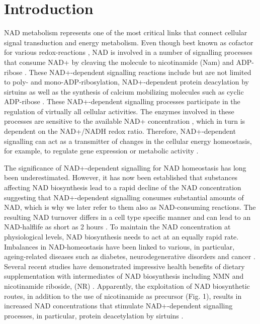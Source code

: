 
\section{Introduction}

NAD metabolism represents one of the most critical links that connect cellular signal transduction and energy metabolism. Even though best known as cofactor for various redox-reactions , NAD is involved in a number of signalling processes that consume NAD+ by cleaving the molecule to nicotinamide (Nam) and ADP-ribose \cite{Verdin2015}. These NAD+-dependent signalling reactions include but are not limited to poly- and mono-ADP-ribosylation, NAD+-dependent protein deacylation by sirtuins as well as the synthesis of calcium mobilizing molecules such as cyclic ADP-ribose \cite{?}. These NAD+-dependent signalling processes participate in the regulation of virtually all cellular activities. The enzymes involved in these processes are sensitive to the available NAD+ concentration \cite{Ruggieri2015}, which in turn is dependent on the NAD+/NADH redox ratio. Therefore, NAD+-dependent signalling can act as a transmitter of changes in the cellular energy homeostasis, for example, to regulate gene expression or metabolic activity \cite{Koch-Nolte2009}.

The significance of NAD+-dependent signalling for NAD homeostasis has long been underestimated. However, it has now been established that substances affecting NAD biosynthesis lead to a rapid decline of the NAD concentration \cite{Buonvicino2018} suggesting that NAD+-dependent signalling consumes substantial amounts of NAD, which is why we later refer to them also as NAD-consuming reactions. The resulting NAD turnover differs in a cell type specific manner and can lead to an NAD-halflife as short as 2 hours \cite{Liu2018}. To maintain the NAD concentration at physiological levels, NAD biosynthesis needs to act at an equally rapid rate. Imbalances in NAD-homeostasis have been linked to various, in particular, ageing-related diseases such as diabetes, neurodegenerative disorders and cancer \cite{Chiarugi2012,Verdin2015}. Several recent studies have demonstrated impressive health benefits of dietary supplementation with intermediates of NAD biosynthesis including NMN and nicotinamide riboside, (NR) \cite{Yoshino2018}. Apparently, the exploitation of NAD biosynthetic routes, in addition to the use of nicotinamide as precursor (Fig. 1), results in increased NAD concentrations that stimulate NAD+-dependent signalling processes, in particular, protein deacetylation by sirtuins \cite{North2004}.

